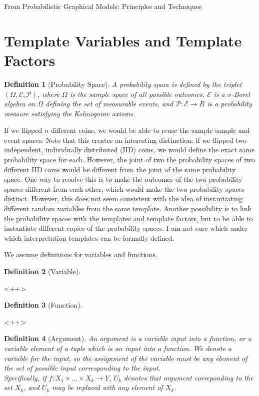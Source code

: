 \documentclass[11pt]{article}
\newtheorem{definition}{Definition}
\begin{document}
From Probabilistic Graphical Models: Principles and Techniques

\section{Template Variables and Template Factors}

\begin{definition}[Probability Space]
  A probability space is defined by the triplet $(\Omega,\mathcal{E},\mathcal{P})$, where $\Omega$ is the sample space of all possible outcomes, $\mathcal{E}$ is a $\sigma$-Borel algebra on $\Omega$ defining the set of measurable events, and $\mathcal{P} \colon \mathcal{E} \rightarrow R$ is a probability measure satisfying the Kolmogorov axioms.
\end{definition}

If we flipped $n$ different coins, we would be able to reuse the sample sample and event spaces.  Note that this creates an interesting distinction: if we flipped two independent, individually distributed (IID) coins, we would define the exact same probability space for each.
However, the joint of two the probability spaces of two different IID coins would be different from the joint of the same probability space. 
One way to resolve this is to make the outcomes of the two probability spaces different from each other, which would make the two probability spaces distinct. 
However, this does not seem consistent with the idea of instantiating different random variables from the same template. 
Another possibility is to link the probability spaces with the templates and template factors, but to be able to instantiate different copies of the probability spaces. 
I am not sure which under which interpretation templates can be formally defined.

We assume definitions for variables and functions.
\begin{definition}[Variable]
  
\end{definition}<++>

\begin{definition}[Function]
  
\end{definition}<++>

\begin{definition}[Argument]
  An argument is a variable input into a function, or a variable element of a tuple which is an input into a function. 
  We denote a variable for the input, so the \emph{ assignment} of the variable must be any element of the set of possible input corresponding to the input. \\
  Specifically, if $f \colon X_1 \times \ldots \times X_k \rightarrow Y$, $U_k$ denotes that argument correponding to the set $X_k$, and $U_k$ may be replaced with any element of $X_k$.
\end{definition}
\end{document}
